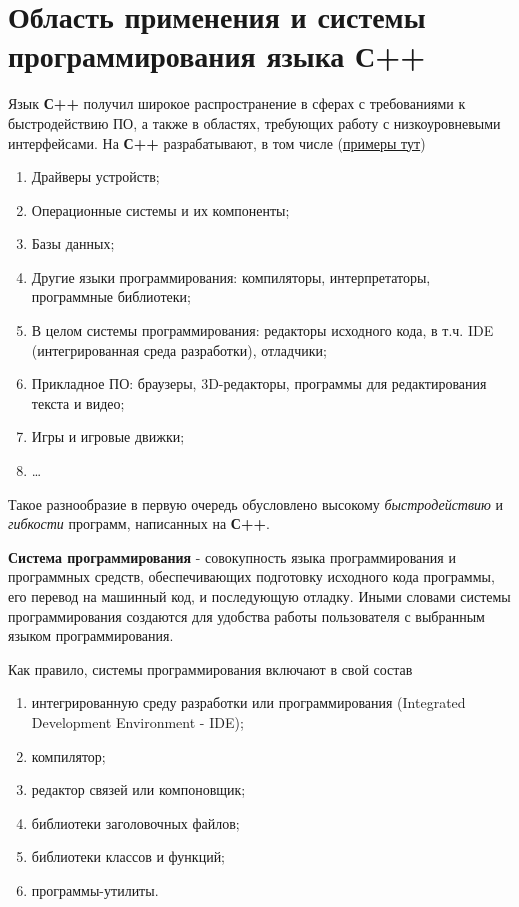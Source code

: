 \section{Область применения и системы программирования языка С++}

Язык \textbf{С++} получил широкое распространение в сферах с
требованиями к быстродействию ПО, а также в областях, требующих работу с
низкоуровневыми интерфейсами. На \textbf{С++} разрабатывают, в том числе
(\hyperref[examples_3]{примеры тут})
\begin{enumerate}
  \item Драйверы устройств;
  \item Операционные системы и их компоненты;
  \item Базы данных;
  \item Другие языки программирования: компиляторы, интерпретаторы,
  программные библиотеки;
  \item В целом системы программирования: редакторы
  исходного кода, в т.ч. IDE (интегрированная среда разработки),
  отладчики;
  \item Прикладное ПО: браузеры, 3D-редакторы, программы для
  редактирования текста и видео;
  \item Игры и игровые движки;
  \item \ldots{}
\end{enumerate}

Такое разнообразие в первую очередь обусловлено высокому
\emph{быстродействию} и \emph{гибкости} программ, написанных на
\textbf{С++}.

\textbf{Система программирования} - совокупность языка программирования
и программных средств, обеспечивающих подготовку исходного кода
программы, его перевод на машинный код, и последующую отладку. Иными
словами системы программирования создаются для удобства работы
пользователя с выбранным языком программирования.

Как правило, системы программирования включают в свой состав
\begin{enumerate}
  \item интегрированную среду разработки или программирования (Integrated Development Environment - IDE);
  \item компилятор;
  \item редактор связей или компоновщик;
  \item библиотеки заголовочных файлов;
  \item библиотеки классов и функций;
  \item программы-утилиты.
\end{enumerate}

